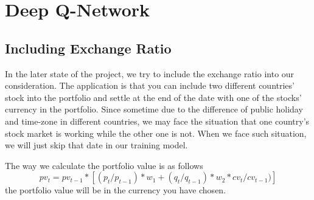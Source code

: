 \section{Deep Q-Network}

\subsection{Including Exchange Ratio}
In the later state of the project, we try to include the exchange ratio into our consideration. The application is that you can include two different countries' stock into the portfolio and settle at the end of the date with one of the stocks' currency in the portfolio. Since sometime due to the difference of public holiday and time-zone in different countries, we may face the situation that one country's stock market is working while the other one is not. When we face such situation, we will just skip that date in our training model.

The way we calculate the portfolio value is as follows
$$ pv_{t} = pv_{t-1} *[ (p_{t} / p_{t-1}) * w_{1}  + (q_{t} / q_{t-1}) * w_{2} * cv_{t}/cv_{t-1})]$$
the portfolio value will be in the currency you have chosen.
\endinput

